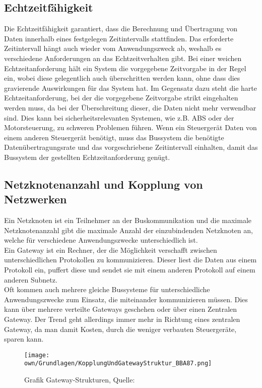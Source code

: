     \subsection{Echtzeitfähigkeit}
    Die Echtzeitfähigkeit garantiert, dass die Berechnung und Übertragung von Daten innerhalb eines festgelegen Zeitintervalls stattfinden.
    Das erforderte Zeitintervall hängt auch wieder vom Anwendungszweck ab, weshalb es verschiedene Anforderungen an das Echtzeitverhalten gibt.
    Bei einer weichen Echtzeitanforderung hält ein System die vorgegebene Zeitvorgabe in der Regel ein, wobei diese gelegentlich auch überschritten werden kann, ohne dass dies gravierende Auswirkungen für das System hat.
    Im Gegensatz dazu steht die harte Echtzeitanforderung, bei der die vorgegebene Zeitvorgabe strikt eingehalten werden muss, da bei der Überschreitung dieser, die Daten nicht mehr verwendbar sind.
    Dies kann bei sicherheitsrelevanten Systemen, wie z.B. \ac{ABS} oder der Motorsteuerung, zu schweren Problemen führen.
    Wenn ein Steuergerät Daten von einem anderen Steuergerät benötigt, muss das Bussystem die benötigte Datenübertragungsrate und das vorgeschriebene Zeitintervall einhalten, damit das Bussystem der gestellten Echtzeitanforderung genügt.

    \subsection{Netzknotenanzahl und Kopplung von Netzwerken}
    Ein Netzknoten ist ein Teilnehmer an der Buskommunikation und die maximale Netzknotenanzahl gibt die maximale Anzahl der einzubindenden Netzknoten an, welche für verschiedene Anwendungszwecke unterschiedlich ist. 
    \\
    Ein Gateway ist ein Rechner, der die Möglichkeit verschafft zwischen unterschiedlichen Protokollen zu kommunizieren.
    Dieser liest die Daten aus einem Protokoll ein, puffert diese und sendet sie mit einem anderen Protokoll auf einem anderen Subnetz.
    \\
    Oft kommen auch mehrere gleiche Bussysteme für unterschiedliche Anwendungszwecke zum Einsatz, die miteinander kommunizieren müssen.
    Dies kann über mehrere verteilte Gateways geschehen oder über einen Zentralen Gateway.
    Der Trend geht allerdings immer mehr in Richtung eines zentralen Gateway, da man damit Kosten, durch die weniger verbauten Steuergeräte, sparen kann.

    \begin{figure}[!htbp]
        \centering
        \texttt{[image: own/Grundlagen/KopplungUndGatewayStruktur\_BBA87.png]}
        \caption{Grafik Gateway-Strukturen, Quelle: \cite{BAA2011, S.87}}
        \label{fig:GatewayStrukuren}
    \end{figure}
    
